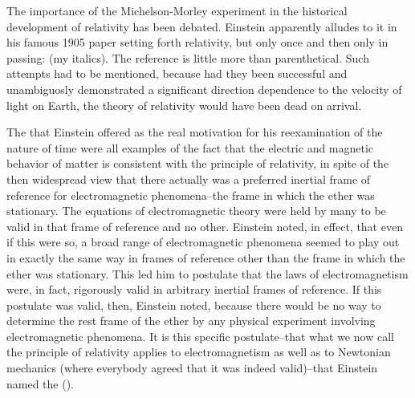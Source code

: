 The importance of the Michelson-Morley experiment in the historical development of relativity has been debated. Einstein apparently alludes to it in his famous 1905 paper setting forth relativity, but only once and then only in passing:  (my italics). The reference is little more than parenthetical. Such attempts had to be mentioned, because had they been successful and unambiguosly demonstrated a significant direction dependence to the velocity of light on Earth, the theory of relativity would have been dead on arrival.

The  that Einstein offered as the real motivation for his reexamination of the nature of time were all examples of the fact that the electric and magnetic behavior of matter is consistent with the principle of relativity, in spite of the then widespread view that there actually was a preferred inertial frame of reference for electromagnetic phenomena--the frame in which the ether was stationary. The equations of electromagnetic theory were held by many to be valid in that frame of reference and no other. Einstein noted, in effect, that even if this were so, a broad range of electromagnetic phenomena seemed to play out in exactly the same way in frames of reference other than the frame in which the ether was stationary. This led him to postulate that the laws of electromagnetism were, in fact, rigorously valid in arbitrary inertial frames of reference. If this postulate was valid, then, Einstein noted,  because there would be no way to determine the rest frame of the ether by any physical experiment involving electromagnetic phenomena. It is this specific postulate--that what we now call the principle of relativity applies to electromagnetism as well as to Newtonian mechanics (where everybody agreed that it was indeed valid)--that Einstein named the  (). 

